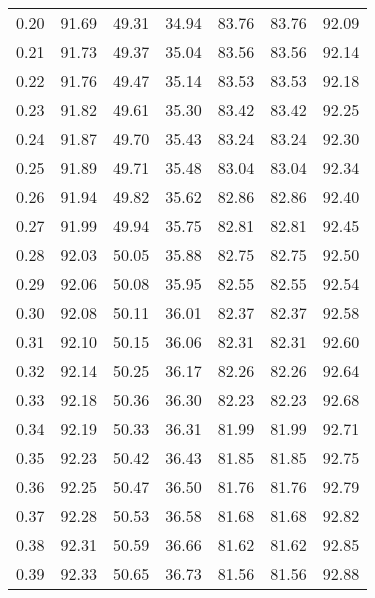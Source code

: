 \begin{tabular}{|c|c|c|c|c|c|c|}
      0.20 &     91.69 &     49.31 &      34.94 &   83.76 &      83.76 &         92.09 \\
      0.21 &     91.73 &     49.37 &      35.04 &   83.56 &      83.56 &         92.14 \\
      0.22 &     91.76 &     49.47 &      35.14 &   83.53 &      83.53 &         92.18 \\
      0.23 &     91.82 &     49.61 &      35.30 &   83.42 &      83.42 &         92.25 \\
      0.24 &     91.87 &     49.70 &      35.43 &   83.24 &      83.24 &         92.30 \\
      0.25 &     91.89 &     49.71 &      35.48 &   83.04 &      83.04 &         92.34 \\
      0.26 &     91.94 &     49.82 &      35.62 &   82.86 &      82.86 &         92.40 \\
      0.27 &     91.99 &     49.94 &      35.75 &   82.81 &      82.81 &         92.45 \\
      0.28 &     92.03 &     50.05 &      35.88 &   82.75 &      82.75 &         92.50 \\
      0.29 &     92.06 &     50.08 &      35.95 &   82.55 &      82.55 &         92.54 \\
      0.30 &     92.08 &     50.11 &      36.01 &   82.37 &      82.37 &         92.58 \\
      0.31 &     92.10 &     50.15 &      36.06 &   82.31 &      82.31 &         92.60 \\
      0.32 &     92.14 &     50.25 &      36.17 &   82.26 &      82.26 &         92.64 \\
      0.33 &     92.18 &     50.36 &      36.30 &   82.23 &      82.23 &         92.68 \\
      0.34 &     92.19 &     50.33 &      36.31 &   81.99 &      81.99 &         92.71 \\
      0.35 &     92.23 &     50.42 &      36.43 &   81.85 &      81.85 &         92.75 \\
      0.36 &     92.25 &     50.47 &      36.50 &   81.76 &      81.76 &         92.79 \\
      0.37 &     92.28 &     50.53 &      36.58 &   81.68 &      81.68 &         92.82 \\
      0.38 &     92.31 &     50.59 &      36.66 &   81.62 &      81.62 &         92.85 \\
      0.39 &     92.33 &     50.65 &      36.73 &   81.56 &      81.56 &         92.88 \\

\end{tabular}
